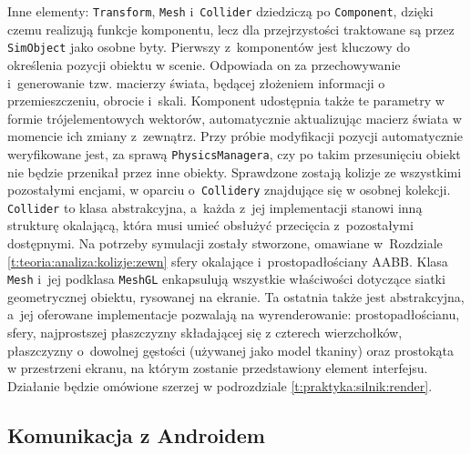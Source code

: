 		Inne elementy: \texttt{Transform}, \texttt{Mesh} i~\texttt{Collider} dziedziczą po \texttt{Component}, dzięki czemu realizują funkcje komponentu, lecz dla przejrzystości traktowane są przez \texttt{SimObject} jako osobne byty. Pierwszy z~komponentów jest kluczowy do określenia pozycji obiektu w scenie. Odpowiada on za przechowywanie i~generowanie tzw. macierzy świata, będącej złożeniem informacji o przemieszczeniu, obrocie i~skali. Komponent udostępnia także te parametry w formie trójelementowych wektorów, automatycznie aktualizując macierz świata w momencie ich zmiany z~zewnątrz. Przy próbie modyfikacji pozycji automatycznie weryfikowane jest, za sprawą \texttt{PhysicsManagera}, czy po takim przesunięciu obiekt nie będzie przenikał przez inne obiekty. Sprawdzone zostają kolizje ze wszystkimi pozostałymi encjami, w oparciu o~\texttt{Collidery} znajdujące się w osobnej kolekcji. \texttt{Collider} to klasa abstrakcyjna, a~każda z~jej implementacji stanowi inną strukturę okalającą, która musi umieć obsłużyć przecięcia z~pozostałymi dostępnymi. Na potrzeby symulacji zostały stworzone, omawiane w~Rozdziale \ref{t:teoria:analiza:kolizje:zewn} sfery okalające i~prostopadłościany AABB. Klasa \texttt{Mesh} i~jej podklasa \texttt{MeshGL} enkapsulują wszystkie właściwości dotyczące siatki geometrycznej obiektu, rysowanej na ekranie. Ta ostatnia także jest abstrakcyjna, a~jej oferowane implementacje pozwalają na wyrenderowanie: prostopadłościanu, sfery, najprostszej płaszczyzny składającej się z czterech wierzchołków, płaszczyzny o~dowolnej gęstości (używanej jako model tkaniny) oraz prostokąta w przestrzeni ekranu, na którym zostanie przedstawiony element interfejsu. Działanie będzie omówione szerzej w podrozdziale \ref{t:praktyka:silnik:render}.
		
		\subsection{Komunikacja z Androidem}
		\label{t:praktyka:silnik:andro}
		
		
